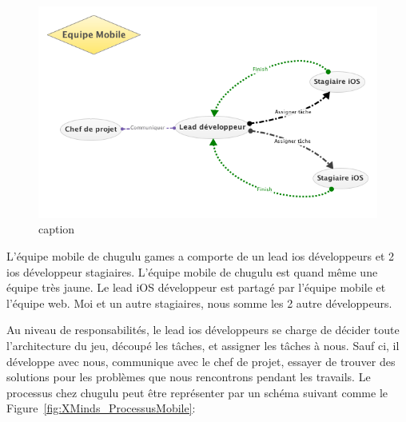 \begin{figure}[htbp]
	\centering
		\includegraphics[width=6in]{XMinds/EquipeMobile.png}
	\caption{caption}
	\label{fig:XMinds_EquipeMobile}
\end{figure}


L'équipe mobile de chugulu games a comporte de un lead ios développeurs et 2 ios développeur stagiaires. L'équipe mobile de chugulu est quand même une équipe très jaune. Le lead iOS développeur est partagé par l'équipe mobile et l'équipe web. Moi et un autre stagiaires, nous somme les 2 autre développeurs. 

Au niveau de responsabilités, le lead ios développeurs se charge de décider toute l'architecture du jeu, découpé les tâches, et assigner les tâches à nous. Sauf ci, il développe avec nous, communique avec le chef de projet, essayer de trouver des solutions pour les problèmes que nous rencontrons pendant les travails. Le processus chez chugulu peut être représenter par un schéma suivant comme le Figure~\ref{fig:XMinds_ProcessusMobile}:

